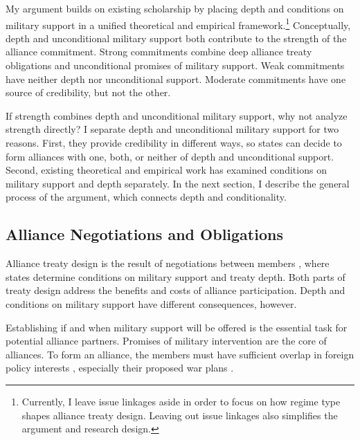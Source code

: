 \documentclass[12pt]{article}
\begin{document}
My argument builds on existing scholarship by placing depth and conditions on military support in a unified theoretical and empirical framework.\footnote{Currently, I leave issue linkages aside in order to focus on how regime type shapes alliance treaty design. Leaving out issue linkages also simplifies the argument and research design.}
Conceptually, depth and unconditional military support both contribute to the strength of the alliance commitment. 
Strong commitments combine deep alliance treaty obligations and unconditional promises of military support. 
Weak commitments have neither depth nor unconditional support. 
Moderate commitments have one source of credibility, but not the other. 


If strength combines depth and unconditional military support, why not analyze strength directly? 
I separate depth and unconditional military support for two reasons. 
First, they provide credibility in different ways, so states can decide to form alliances with one, both, or neither of depth and unconditional support.  
Second, existing theoretical and empirical work has examined conditions on military support and depth separately. 
In the next section, I describe the general process of the argument, which connects depth and conditionality. 


\subsection{Alliance Negotiations and Obligations}


Alliance treaty design is the result of negotiations between members \citep{Poast2019a}, where states determine conditions on military support and treaty depth.
Both parts of treaty design address the benefits and costs of alliance participation. 
Depth and conditions on military support have different consequences, however. 


Establishing if and when military support will be offered is the essential task for potential alliance partners. 
Promises of military intervention are the core of alliances. 
To form an alliance, the members must have sufficient overlap in foreign policy interests \citep{Morrow1991, Smith1995, FordhamPoast2014}, especially their proposed war plans \citep{Poast2019a}.  
\end{document}
